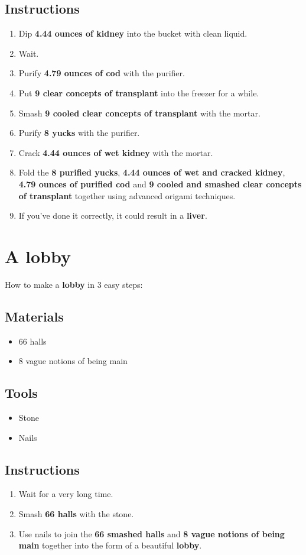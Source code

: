 \documentclass{article}
\begin{document}
\subsection{Instructions}\begin{enumerate}
\item 
Dip \textbf{4.44 ounces of kidney} into the bucket with clean liquid.
\item 
Wait.
\item 
Purify \textbf{4.79 ounces of cod} with the purifier.
\item 
Put \textbf{9 clear concepts of transplant} into the freezer for a while.
\item 
Smash \textbf{9 cooled clear concepts of transplant} with the mortar.
\item 
Purify \textbf{8 yucks} with the purifier.
\item 
Crack \textbf{4.44 ounces of wet kidney} with the mortar.
\item 
Fold the \textbf{8 purified yucks}, \textbf{4.44 ounces of wet and cracked kidney}, \textbf{4.79 ounces of purified cod} and \textbf{9 cooled and smashed clear concepts of transplant} together using advanced origami techniques.
\item 
If you've done it correctly, it could result in a \textbf{liver}.
\end{enumerate}
\newpage
\section{A lobby}How to make a \textbf{lobby} in 3 easy steps:

\subsection{Materials}\begin{itemize}
\item 
66 halls
\item 
8 vague notions of being main
\end{itemize}
\subsection{Tools}\begin{itemize}
\item 
Stone
\item 
Nails
\end{itemize}
\subsection{Instructions}\begin{enumerate}
\item 
Wait for a very long time.
\item 
Smash \textbf{66 halls} with the stone.
\item 
Use nails to join the \textbf{66 smashed halls} and \textbf{8 vague notions of being main} together into the form of a beautiful \textbf{lobby}.
\end{enumerate}
\newpage
\end{document}
